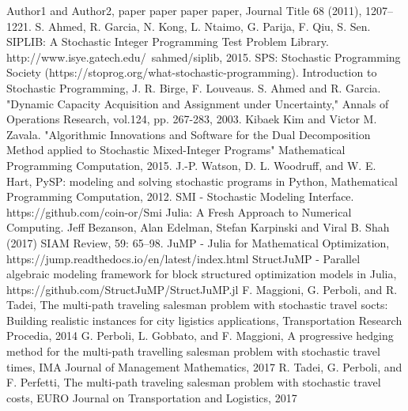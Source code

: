 \begin{thebibliography}{9} 
	Author1 and Author2, paper paper paper paper, Journal Title 68 (2011), 1207--1221.
	S. Ahmed, R. Garcia, N. Kong, L. Ntaimo, G. Parija, F. Qiu, S. Sen. SIPLIB: A Stochastic Integer Programming Test Problem Library. http://www.isye.gatech.edu/~sahmed/siplib, 2015.
	SPS: Stochastic Programming Society (https://stoprog.org/what-stochastic-programming).
	Introduction to Stochastic Programming, J. R. Birge, F. Louveaus.
	S. Ahmed and R. Garcia. "Dynamic Capacity Acquisition and Assignment under Uncertainty," Annals of Operations Research, vol.124, pp. 267-283, 2003.
	Kibaek Kim and Victor M. Zavala. "Algorithmic Innovations and Software for the Dual Decomposition Method applied to Stochastic Mixed-Integer Programs" Mathematical Programming Computation, 2015.
	J.-P. Watson, D. L. Woodruff, and W. E. Hart, PySP: modeling and solving stochastic programs in Python, Mathematical Programming Computation, 2012.
	SMI - Stochastic Modeling Interface. https://github.com/coin-or/Smi
	Julia: A Fresh Approach to Numerical Computing. Jeff Bezanson, Alan Edelman, Stefan Karpinski and Viral B. Shah (2017) SIAM Review, 59: 65–98.
	JuMP - Julia for Mathematical Optimization, https://jump.readthedocs.io/en/latest/index.html
	StructJuMP - Parallel algebraic modeling framework for block structured optimization models in Julia, https://github.com/StructJuMP/StructJuMP.jl
	F. Maggioni, G. Perboli, and R. Tadei, The multi-path traveling salesman problem with stochastic travel socts: Building realistic instances for city ligistics applications, Transportation Research Procedia, 2014
	G. Perboli, L. Gobbato, and F. Maggioni, A progressive hedging method for the multi-path travelling salesman problem with stochastic travel times, IMA Journal of Management Mathematics, 2017
	R. Tadei, G. Perboli, and F. Perfetti, The multi-path traveling salesman problem with stochastic travel costs, EURO Journal on Transportation and Logistics, 2017
\end{thebibliography}


